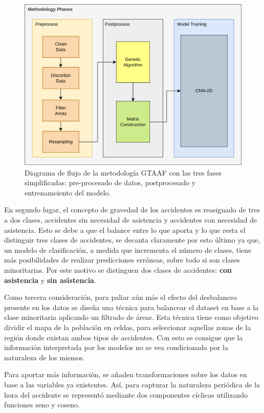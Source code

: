 \documentclass{uathesis-es}
\begin{document}
	\begin{figure}[H]
		\centering
		\includegraphics[width=14cm]{Figures/7th DataFlow Chart.png}
		\caption{Diagrama de flujo de la metodología GTAAF con las tres fases simplificadas: pre-procesado de datos, postprocesado y entrenameiento del modelo.}
		\label{DataFlow}
	\end{figure}
	
	En segundo lugar, el concepto de gravedad de los accidentes es reasignado de tres a dos clases, accidentes sin necesidad de asistencia y accidentes con necesidad de asistencia. Esto se debe a que el balance entre lo que aporta  y lo que resta el distinguir tres clases de accidentes, se decanta claramente por esto último ya que, un modelo de clasificación, a medida que incrementa el número de clases, tiene más posibilidades de realizar predicciones erróneas, sobre todo si son clases minoritarias. Por este motivo se distinguen dos clases de accidentes: \textbf{con asistencia} y \textbf{sin asistencia}.
	
	Como tercera consideración, para paliar aún más el efecto del desbalanceo presente en los datos se diseña una técnica para balancear el dataset en base a la clase minoritaria aplicando un filtrado de áreas. Esta técnica tiene como objetivo dividir el mapa de la población en celdas, para seleccionar aquellas zonas de la región donde existan ambos tipos de accidentes. Con esto se consigue que la información interpretada por los modelos no se vea condicionada por la naturaleza de los mismos.
	
	Para aportar más información, se añaden transformaciones sobre los datos en base a las variables ya existentes. Así, para capturar la naturaleza periódica de la hora del accidente se representó mediante dos componentes cíclicas utilizando funciones seno y coseno. 
	
\end{document}
